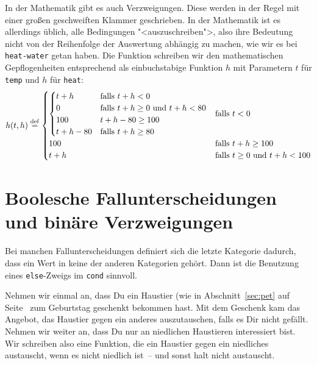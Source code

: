 In der Mathematik gibt es auch Verzweigungen.  Diese werden in der
Regel mit einer großen geschweiften Klammer geschrieben.  In der
Mathematik ist es allerdings üblich, alle Bedingungen
"<auszuschreiben">, also ihre Bedeutung nicht von der Reihenfolge der
Auswertung abhängig zu machen, wie wir es bei \texttt{heat-water}
getan haben.  Die Funktion schreiben wir den mathematischen
Gepflogenheiten entsprechend als einbuchstabige Funktion $h$ mit
Parametern $t$ für \texttt{temp} und $h$ für \texttt{heat}:
%
\begin{displaymath}
  h(t, h) \stackrel{\rm def}{=}
  \begin{cases}
    \begin{cases}
      t + h & \text{falls } t + h < 0\\
      0 & \text{falls } t + h \geq 0 \text{ und } t + h < 80 \\
      100 & t + h - 80 \geq 100\\
      t + h - 80 & \text{falls }  t +h \geq
      80
    \end{cases}
    & \text{falls } t < 0
    \\
    100 & \text{falls } t + h \geq 100
    \\
    t + h & \text{falls } t \geq 0 \text{ und } t + h < 100
  \end{cases}
\end{displaymath}

\section{Boolesche Fallunterscheidungen und binäre Verzweigungen}
\label{sec:binaere-verzweigungen}

Bei manchen Fallunterscheidungen definiert sich die letzte Kategorie
dadurch, dass ein Wert in keine der anderen Kategorien gehört.  Dann
ist die Benutzung eines \texttt{else}-Zweigs im \texttt{cond}
sinnvoll.

Nehmen wir einmal an, dass Du ein Haustier (wie in
Abschnitt~\ref{sec:pet} auf Seite~\pageref{sec:pet} zum Geburtstag
geschenkt bekommen hast. Mit dem Geschenk kam das Angebot, das
Haustier gegen ein anderes auszutauschen, falls es Dir nicht gefällt.
Nehmen wir weiter an, dass Du nur an niedlichen Haustieren
interessiert bist.  Wir schreiben also eine Funktion, die ein Haustier
gegen ein niedliches austauscht, wenn es nicht niedlich ist~-- und
sonst halt nicht austauscht.

